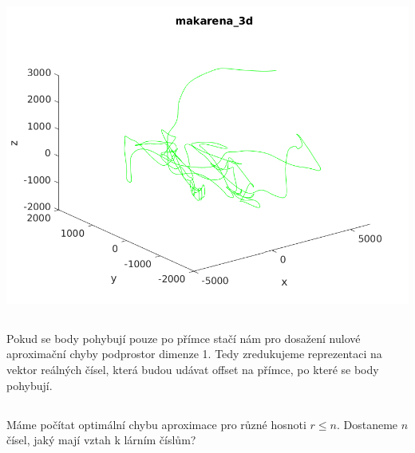 \documentclass[10pt,a4paper,openright]{article}
\begin{document}
\includegraphics[scale=0.5]{makarena_3d.png}\\

\subsection{}
Pokud se body pohybují pouze po přímce stačí nám pro dosažení nulové aproximační chyby podprostor dimenze 1.
Tedy zredukujeme reprezentaci na vektor reálných čísel, která budou udávat offset na přímce, po které se body pohybují.

\subsection{}
Máme počítat optimální chybu aproximace pro různé hosnoti $r \leq n$.
Dostaneme $n$ čísel, jaký mají vztah k lárním číslům?
\end{document}
